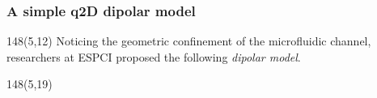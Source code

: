 \begin{frame}
  \frametitle{A simple q2D dipolar model}

  \begin{textblock}{148}(5,12)
    Noticing the geometric confinement of the microfluidic channel, researchers at ESPCI proposed the following \emph{dipolar model}.
  \end{textblock}

  \begin{textblock}{148}(5,19)
    \begin{columns}[T]
      
      \begin{column}{0.45\textwidth}
        \vskip0.2cm
        \centering
      \end{column}
      

\end{columns}
\end{textblock}
\end{frame}
